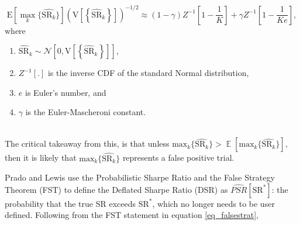 \documentclass[a4paper,11pt,oneside]{article}
\DeclareMathOperator*{\E}{\mathbb{E}}
\theoremstyle{plain}
\theoremstyle{definition}
\begin{document}
	\begin{equation}\label{eq_falsestrat}
		\mathrm{E}\left[{\max_k}\{\widehat{\mathrm{SR}_k}\}\right]\left(\mathrm{V}\left[\left\{\widehat{\mathrm{SR}}_{k}\right\}\right]\right)^{-1 / 2}\approx(1-\gamma) Z^{-1}\left[1-\frac{1}{K}\right]+\gamma Z^{-1}\left[1-\frac{1}{K e}\right], 
	\end{equation}
		where
	\begin{enumerate}
		\item $\widehat{\mathrm{SR}}_{k} \sim \mathcal{N}\left[0, \mathrm{V}\left[\left\{\widehat{\mathrm{SR}}_{k}\right\}\right]\right]$, 
		\item $Z^{-1}[.]$ is the inverse CDF of the standard Normal distribution, 
		\item $e$ is Euler's number, and 
		\item $\gamma$ is the Euler-Mascheroni constant.
	\end{enumerate}
	~\\
	The critical takeaway from this, is that unless $\mathrm{max}_k\{\widehat{\mathrm{SR}_k}\} > \E\left[\mathrm{max}_k\{\widehat{\mathrm{SR}_k}\}\right]$, then it is likely that $\mathrm{max}_k\{\widehat{\mathrm{SR}_k}\}$ represents a false positive trial.
		
		
	

	 
	Prado and Lewis use the Probabilistic Sharpe Ratio and the False Strategy Theorem (FST) to define the Deflated Sharpe Ratio (DSR) as $\widehat{PSR}[\mathrm{SR}^*]$: the probability that the true SR exceeds $\mathrm{SR}^*$, which no longer needs to be user defined. Following from the FST statement in equation \eqref{eq_falsestrat}, 
\end{document}

